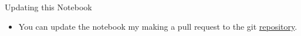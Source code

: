 \documentclass[10pt, xcolor={dvipsnames}, aspectratio = 169, sans,mathserif]{beamer}
\begin{document}
\begin{frame}{Updating this Notebook}

\begin{itemize}

    \item You can update the notebook my making a pull request to the git \href{https://github.com/dinupa1/NIM_Hodo_Handbook}{repository}.

\end{itemize}

\end{frame}
\end{document}
